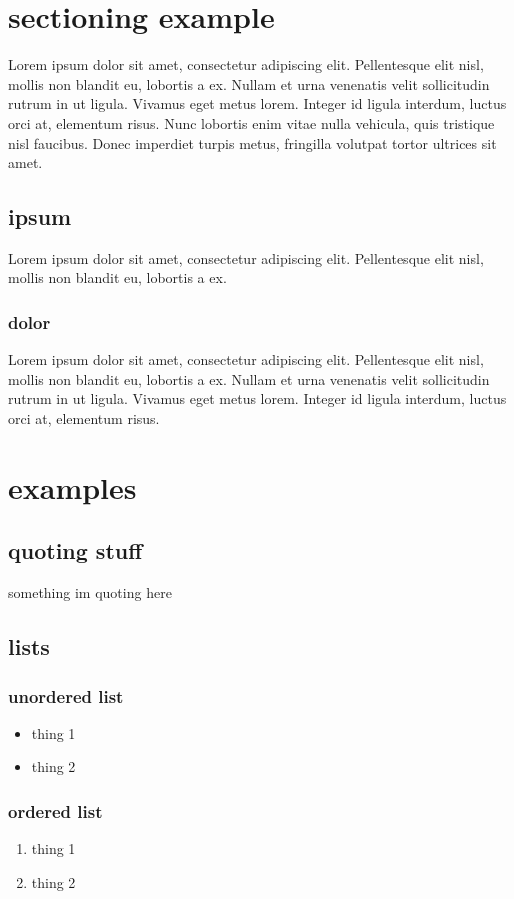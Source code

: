 \section{sectioning example}
Lorem ipsum dolor sit amet, consectetur adipiscing elit. Pellentesque elit nisl, mollis non blandit eu, lobortis a ex. Nullam et urna venenatis velit sollicitudin rutrum in ut ligula. Vivamus eget metus lorem. Integer id ligula interdum, luctus orci at, elementum risus. Nunc lobortis enim vitae nulla vehicula, quis tristique nisl faucibus. Donec imperdiet turpis metus, fringilla volutpat tortor ultrices sit amet.
\subsection{ipsum}
Lorem ipsum dolor sit amet, consectetur adipiscing elit. Pellentesque elit nisl, mollis non blandit eu, lobortis a ex.
\subsubsection{dolor}
Lorem ipsum dolor sit amet, consectetur adipiscing elit. Pellentesque elit nisl, mollis non blandit eu, lobortis a ex. Nullam et urna venenatis velit sollicitudin rutrum in ut ligula. Vivamus eget metus lorem. Integer id ligula interdum, luctus orci at, elementum risus. 

\newpage %
\section{examples}
\subsection{quoting stuff}
something im quoting here\cite{USLI_handbook}

\subsection{lists}

\subsubsection{unordered list}
\begin{itemize}
\item thing 1
\item thing 2
\end{itemize}

\subsubsection{ordered list}
\begin{enumerate}
\item thing 1
\item thing 2
\end{enumerate}

